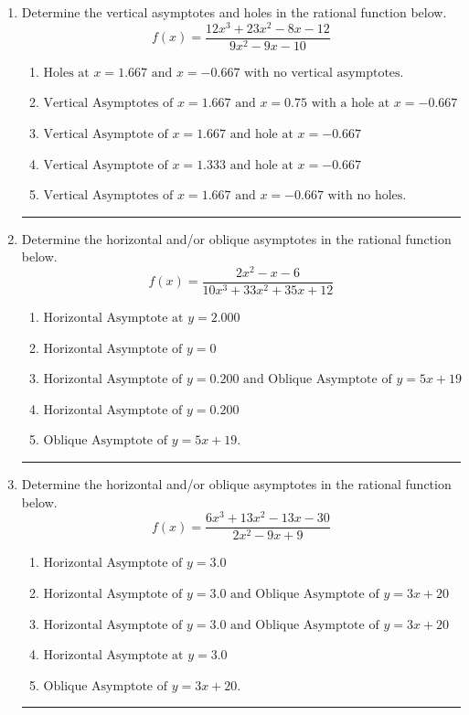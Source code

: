 \documentclass[14pt]{extbook}
\newcommand{\litem}[1]{\item#1\hspace*{-1cm}\rule{\textwidth}{0.4pt}}
\begin{document}
\begin{enumerate}
\litem{
Determine the vertical asymptotes and holes in the rational function below.\[ f(x) = \frac{12x^{3} +23 x^{2} -8 x -12}{9x^{2} -9 x -10} \]\begin{enumerate}[label=\Alph*.]
\item \( \text{Holes at } x = 1.667 \text{ and } x = -0.667 \text{ with no vertical asymptotes.} \)
\item \( \text{Vertical Asymptotes of } x = 1.667 \text{ and } x = 0.75 \text{ with a hole at } x = -0.667 \)
\item \( \text{Vertical Asymptote of } x = 1.667 \text{ and hole at } x = -0.667 \)
\item \( \text{Vertical Asymptote of } x = 1.333 \text{ and hole at } x = -0.667 \)
\item \( \text{Vertical Asymptotes of } x = 1.667 \text{ and } x = -0.667 \text{ with no holes.} \)

\end{enumerate} }
\litem{
Determine the horizontal and/or oblique asymptotes in the rational function below.\[ f(x) = \frac{2x^{2} -x -6}{10x^{3} +33 x^{2} +35 x + 12} \]\begin{enumerate}[label=\Alph*.]
\item \( \text{Horizontal Asymptote at } y = 2.000 \)
\item \( \text{Horizontal Asymptote of } y = 0 \)
\item \( \text{Horizontal Asymptote of } y = 0.200 \text{ and Oblique Asymptote of } y = 5x + 19 \)
\item \( \text{Horizontal Asymptote of } y = 0.200  \)
\item \( \text{Oblique Asymptote of } y = 5x + 19. \)

\end{enumerate} }
\litem{
Determine the horizontal and/or oblique asymptotes in the rational function below.\[ f(x) = \frac{6x^{3} +13 x^{2} -13 x -30}{2x^{2} -9 x + 9} \]\begin{enumerate}[label=\Alph*.]
\item \( \text{Horizontal Asymptote of } y = 3.0  \)
\item \( \text{Horizontal Asymptote of } y = 3.0 \text{ and Oblique Asymptote of } y = 3x + 20 \)
\item \( \text{Horizontal Asymptote of } y = 3.0 \text{ and Oblique Asymptote of } y = 3x + 20 \)
\item \( \text{Horizontal Asymptote at } y = 3.0 \)
\item \( \text{Oblique Asymptote of } y = 3x + 20. \)


\end{enumerate}}
\end{enumerate}
\end{document}
